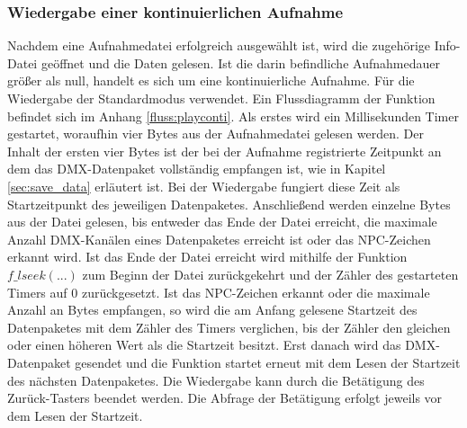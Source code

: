 
\subsubsection{Wiedergabe einer kontinuierlichen Aufnahme}
Nachdem eine Aufnahmedatei erfolgreich ausgewählt ist, wird die zugehörige Info-Datei geöffnet und die Daten gelesen. Ist die darin befindliche Aufnahmedauer größer als null, handelt es sich um eine kontinuierliche Aufnahme. Für die Wiedergabe der Standardmodus verwendet. Ein Flussdiagramm der Funktion befindet sich im Anhang \ref{fluss:playconti}. Als erstes wird ein Millisekunden Timer gestartet, woraufhin vier Bytes aus der Aufnahmedatei gelesen werden. Der Inhalt der ersten vier Bytes ist der bei der Aufnahme registrierte Zeitpunkt an dem das DMX-Datenpaket vollständig empfangen ist, wie in Kapitel \ref{sec:save_data} erläutert ist. Bei der Wiedergabe fungiert diese Zeit als Startzeitpunkt des jeweiligen Datenpaketes. Anschließend werden einzelne Bytes aus der Datei gelesen, bis entweder das Ende der Datei erreicht, die maximale Anzahl DMX-Kanälen eines Datenpaketes erreicht ist oder das NPC-Zeichen erkannt wird. Ist das Ende der Datei erreicht wird mithilfe der Funktion $f\_lseek(...)$ zum Beginn der Datei zurückgekehrt und der Zähler des gestarteten Timers auf 0 zurückgesetzt. Ist das NPC-Zeichen erkannt oder die maximale Anzahl an Bytes empfangen, so wird die am Anfang gelesene Startzeit des Datenpaketes mit dem Zähler des Timers verglichen, bis der Zähler den gleichen oder einen höheren Wert als die Startzeit besitzt. Erst danach wird das DMX-Datenpaket gesendet und die Funktion startet erneut mit dem Lesen der Startzeit des nächsten Datenpaketes. Die Wiedergabe kann durch die Betätigung des Zurück-Tasters beendet werden. Die Abfrage der Betätigung erfolgt jeweils vor dem Lesen der Startzeit.
